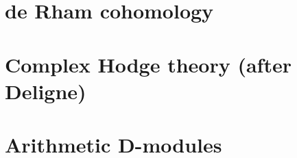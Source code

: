         \begin{appendices}
            \chapter{de Rham cohomology}
                \begin{abstract}
                    
                \end{abstract}
                
                \minitoc
                
                
                
                
                
            \chapter{Complex Hodge theory (after Deligne)}
                \begin{abstract}
                    
                \end{abstract}
                
                \minitoc
                
                
                
                
                
                
                
                
        \end{appendices}
            
        \chapter{Arithmetic D-modules}
            \begin{abstract}
                
            \end{abstract}
            
            \minitoc
            
